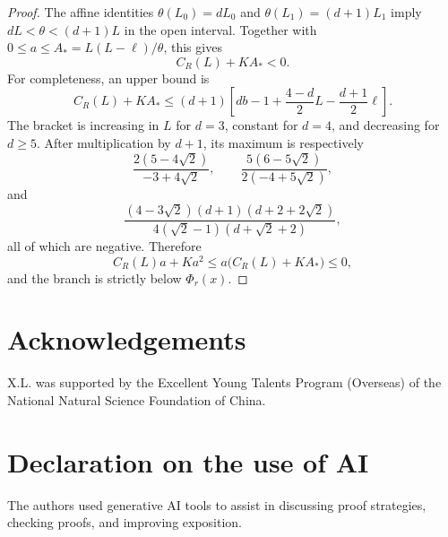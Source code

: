 \documentclass[10pt]{article}
\numberwithin{equation}{section}
\begin{document}
\begin{proof}
The affine identities $\theta(L_0)=dL_0$ and $\theta(L_1)=(d+1)L_1$ imply $dL<\theta<(d+1)L$ in the open interval.  Together with $0\le a\le A_*=L(L-\ell)/\theta$, this gives
\[
 C_R(L)+KA_*<0.
\]
For completeness, an upper bound is
\[
 C_R(L)+KA_*
 \le(d+1)\left[db-1+\frac{4-d}{2}L-\frac{d+1}{2}\ell\right].
\]
The bracket is increasing in $L$ for $d=3$, constant for $d=4$, and decreasing for $d\ge5$.  After multiplication by $d+1$, its maximum is respectively
\[
 \frac{2(5-4\sqrt2)}{-3+4\sqrt2},
 \qquad
 \frac{5(6-5\sqrt2)}{2(-4+5\sqrt2)},
\]
and
\[
 \frac{(4-3\sqrt2)(d+1)(d+2+2\sqrt2)}
 {4(\sqrt2-1)(d+\sqrt2+2)},
\]
all of which are negative.  Therefore
\[
 C_R(L)a+Ka^2\le a\bigl(C_R(L)+KA_*\bigr)\le0,
\]
and the branch is strictly below $\Phi_r(x)$.
\end{proof}

\section*{Acknowledgements}

X.L. was supported by the Excellent Young Talents Program (Overseas) of the National Natural Science Foundation of China.

\section*{Declaration on the use of AI}

The authors used generative AI tools to assist in discussing proof strategies, checking proofs, and improving exposition.



\end{document}
